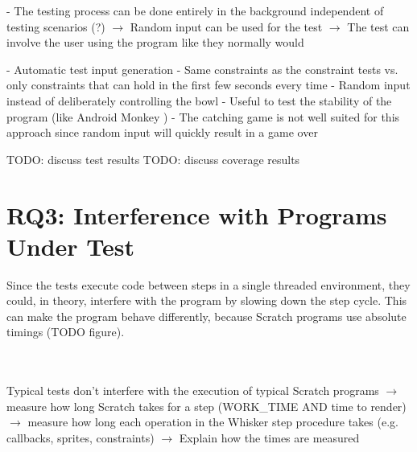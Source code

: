 
- The testing process can be done entirely in the background independent of testing scenarios (?)
    $\rightarrow$ Random input can be used for the test
    $\rightarrow$ The test can involve the user using the program like they normally would


- Automatic test input generation
- Same constraints as the constraint tests vs. only constraints that can hold in the first few seconds every time
    - Random input instead of deliberately controlling the bowl
    - Useful to test the stability of the program (like Android Monkey \cite{androidmonkey})
    - The catching game is not well suited for this approach since random input will quickly result in a game over

TODO: discuss test results
TODO: discuss coverage results

\section{RQ3: Interference with Programs Under Test}

Since the tests execute code between steps in a single threaded environment,
they could, in theory, interfere with the program by slowing down the step cycle.
This can make the program behave differently, because Scratch programs use absolute timings (TODO figure).

~\\~\\
Typical tests don't interfere with the execution of typical Scratch programs
$\rightarrow$ measure how long Scratch takes for a step (WORK\_TIME AND time to render)
$\rightarrow$ measure how long each operation in the Whisker step procedure takes (e.g. callbacks, sprites, constraints)
$\rightarrow$ Explain how the times are measured

